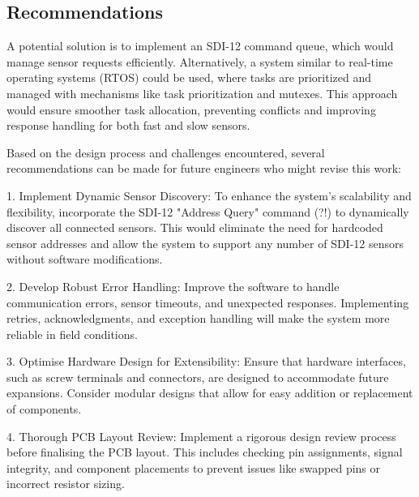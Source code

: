 \subsection{Recommendations}


A potential solution is to implement an SDI-12 command queue, which would manage sensor requests efficiently. Alternatively, a system similar to real-time operating systems (RTOS) could be used, where tasks are prioritized and managed with mechanisms like task prioritization and mutexes. This approach would ensure smoother task allocation, preventing conflicts and improving response handling for both fast and slow sensors.

Based on the design process and challenges encountered, several recommendations can be made for future engineers who might revise this work:

1. Implement Dynamic Sensor Discovery: To enhance the system's scalability and flexibility, incorporate the SDI-12 "Address Query" command (?!) to dynamically discover all connected sensors. This would eliminate the need for hardcoded sensor addresses and allow the system to support any number of SDI-12 sensors without software modifications.

2. Develop Robust Error Handling: Improve the software to handle communication errors, sensor timeouts, and unexpected responses. Implementing retries, acknowledgments, and exception handling will make the system more reliable in field conditions.

3. Optimise Hardware Design for Extensibility: Ensure that hardware interfaces, such as screw terminals and connectors, are designed to accommodate future expansions. Consider modular designs that allow for easy addition or replacement of components.

4. Thorough PCB Layout Review: Implement a rigorous design review process before finalising the PCB layout. This includes checking pin assignments, signal integrity, and component placements to prevent issues like swapped pins or incorrect resistor sizing.

